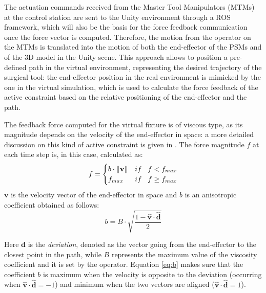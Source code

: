 \documentclass[conference]{IEEEtran}
\newcommand{\vers}[1]{\hat{\textbf{#1}}}
\newcommand{\vect}[1]{\textbf{#1}}
\newcommand{\norm}[1]{\left\lVert #1\right\rVert}
\begin{document}
The actuation commands received from the Master Tool Manipulators (MTMs) at the control station are sent to the Unity environment through a ROS framework, which will also be the basis for the force feedback communication once the force vector is computed. Therefore, the motion from the operator on the MTMs is translated into the motion of both the end-effector of the PSMs and of the 3D model in the Unity scene. This approach allows to position a pre-defined path in the virtual environment, representing the desired trajectory of the surgical tool: the end-effector position in the real environment is mimicked by the one in the virtual simulation, which is used to calculate the force feedback of the active constraint based on the relative positioning of the end-effector and the path. 

The feedback force computed for the virtual fixture is of viscous type, as its magnitude depends on the velocity of the end-effector in space: a more detailed discussion on this kind of active constraint is given in \cite{equations}. The force magnitude $f$ at each time step is, in this case, calculated as:
\begin{equation}
    f = \begin{cases}
    b\cdot \norm{\vect{v}} & if \hspace{0.3cm}f<f_{max} \\
    f_{max} & if \hspace{0.3cm} f\geq f_{max}
    \end{cases}
    \label{eq:1}
\end{equation}
$\textbf{v}$ is the velocity vector of the end-effector in space and $b$ is an anisotropic coefficient obtained as follows:
\begin{equation}
    b = B\cdot\sqrt{\frac{1-\vers{v}\cdot\vers{d}}{2}}
    \label{eq:b}
\end{equation}

Here $\textbf{d}$ is the \textit{deviation}, denoted as the vector going from the end-effector to the closest point in the path, while $B$ represents the maximum value of the viscosity coefficient and it is set by the operator. Equation \ref{eq:b} makes sure that the coefficient $b$ is maximum when the velocity is opposite to the deviation (occurring when $\hat{\textbf{v}}\cdot\hat{\textbf{d}}=-1$) and minimum when the two vectors are aligned ($\hat{\textbf{v}}\cdot\hat{\textbf{d}}=1$). 
\end{document}
